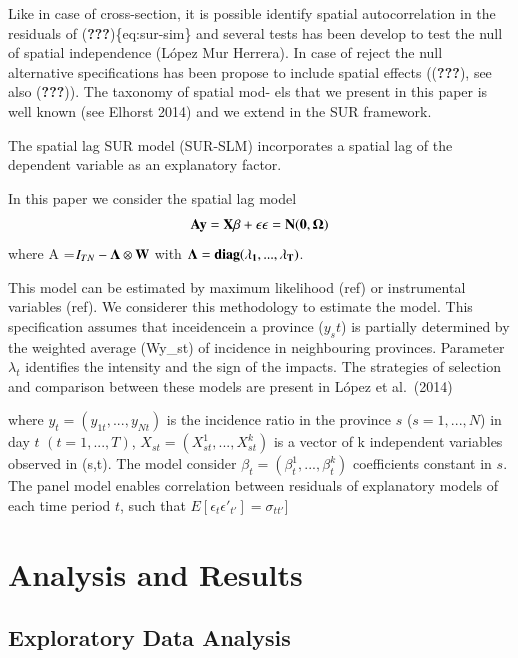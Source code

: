 \documentclass[]{elsarticle} %
\begin{document}
Like in case of cross-section, it is possible identify spatial
autocorrelation in the residuals of ({\textbf{???}})\{eq:sur-sim\} and
several tests has been develop to test the null of spatial independence
(López Mur Herrera). In case of reject the null alternative
specifications has been propose to include spatial effects
(({\textbf{???}}), see also ({\textbf{???}})). The taxonomy of spatial
mod- els that we present in this paper is well known (see Elhorst 2014)
and we extend in the SUR framework.

The spatial lag SUR model (SUR-SLM) incorporates a spatial lag of the
dependent variable as an explanatory factor.

In this paper we consider the spatial lag model \begin{equation}
\bf{A}y = X \beta + \epsilon \\
\epsilon =N(0,\Omega)
\label{eq:sur-slm}
\end{equation} where A =\(I_{TN}-\bf{\Lambda} \otimes W\) with
\(\bf{\Lambda} = diag(\lambda_1,...,\lambda_T)\).

This model can be estimated by maximum likelihood (ref) or instrumental
variables (ref). We considerer this methodology to estimate the model.
This specification assumes that inceidencein a province (\(y_st\)) is
partially determined by the weighted average (Wy\_st) of incidence in
neighbouring provinces. Parameter \(\lambda_t\) identifies the intensity
and the sign of the impacts. The strategies of selection and comparison
between these models are present in López et al.~(2014)

where \(y_{t}=(y_{1t},...,y_{Nt})\) is the incidence ratio in the
province \(s\) (\(s=1,...,N\)) in day \(t\) \((t=1,...,T)\),
\(X_{st}=(X^1_{st},...,X^k_{st})\) is a vector of k independent
variables observed in (s,t). The model consider
\(\beta_t=(\beta^1_t,...,\beta^k_t)\) coefficients constant in \(s\).
The panel model enables correlation between residuals of explanatory
models of each time period \(t\), such that
\(E[\epsilon_t \epsilon'_{t'}]=\sigma_{tt'}]\)

\hypertarget{analysis-and-results}{%
\section{Analysis and Results}\label{analysis-and-results}}

\hypertarget{exploratory-data-analysis}{%
\subsection{Exploratory Data Analysis}\label{exploratory-data-analysis}}
\end{document}
